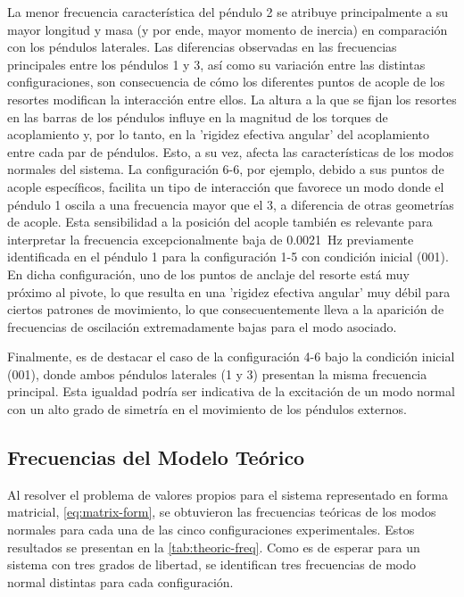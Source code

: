 La menor frecuencia caracter\'istica del p\'endulo 2 se atribuye
principalmente a su mayor longitud y masa (y por ende, mayor momento
de inercia) en comparaci\'on con los p\'endulos laterales. Las
diferencias observadas en las frecuencias principales entre los
p\'endulos 1 y 3, as\'i como su variaci\'on entre las distintas
configuraciones, son consecuencia de c\'omo los diferentes puntos de
acople de los resortes modifican la interacci\'on entre ellos. La
altura a la que se fijan los resortes en las barras de los
p\'endulos influye en la magnitud de los torques de acoplamiento y,
por lo tanto, en la 'rigidez efectiva angular' del acoplamiento
entre cada par de p\'endulos. Esto, a su vez, afecta las
caracter\'isticas de los modos normales del sistema. La
configuraci\'on 6-6, por ejemplo, debido a sus puntos de acople
espec\'ificos, facilita un tipo de interacci\'on que
favorece un modo donde el p\'endulo 1 oscila a una frecuencia mayor
que el 3, a diferencia de otras geometr\'ias de acople.
Esta sensibilidad a la posici\'on del acople tambi\'en es relevante
para interpretar la frecuencia excepcionalmente baja de
\qty{0.0021}{\Hz} previamente identificada en el p\'endulo 1 para la
configuraci\'on 1-5 con condici\'on inicial (001). En dicha
configuraci\'on, uno de los puntos de anclaje del resorte est\'a
muy pr\'oximo al pivote, lo que resulta en una 'rigidez efectiva
angular' muy d\'ebil para ciertos patrones de movimiento, lo que
consecuentemente lleva a la aparici\'on de frecuencias de
oscilaci\'on extremadamente bajas para el modo asociado.

Finalmente, es de destacar el caso de la configuraci\'on 4-6 bajo la
condici\'on inicial (001), donde ambos p\'endulos laterales (1 y 3)
presentan la misma frecuencia principal. Esta igualdad podr\'ia ser
indicativa de la excitaci\'on de un modo normal con un alto grado de
simetr\'ia en el movimiento de los p\'endulos externos.

\subsection*{Frecuencias del Modelo Teórico}

Al resolver el problema de valores propios para el sistema representado
en forma matricial, \cref{eq:matrix-form}, se obtuvieron las
frecuencias te\'oricas de los modos normales para cada una de las
cinco configuraciones experimentales. Estos resultados se presentan
en la \cref{tab:theoric-freq}. Como es de esperar para un sistema
con tres grados de libertad, se identifican tres frecuencias de modo
normal distintas para cada configuraci\'on.

